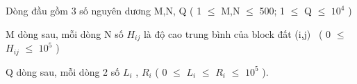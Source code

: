Dòng đầu gồm 3 số nguyên dương M,N, Q ( 1  $\le$  M,N  $\le$  500; 1  $\le$  Q  $\le$  $10^{4}$ )


M dòng sau, mỗi dòng N số $H_{ij}$ là độ cao trung bình của block đất (i,j)  ( 0  $\le$  $H_{ij}$  $\le$  $10^{5}$ )


Q dòng sau, mỗi dòng 2 số $L_{i}$ , $R_{i}$ ( 0  $\le$  $L_{i}$  $\le$  $R_{i}$  $\le$  $10^{5}$ ).